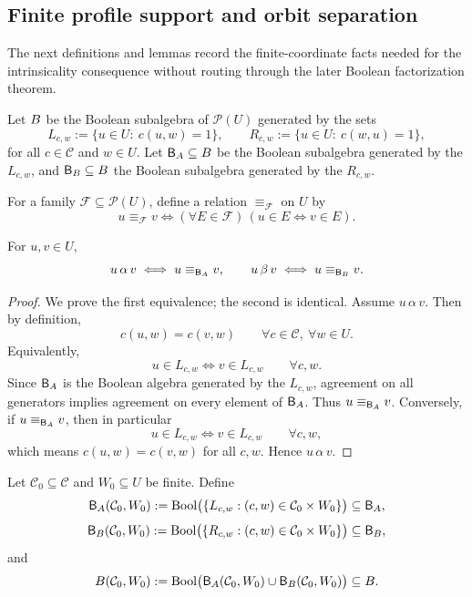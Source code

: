 \subsection{Finite profile support and orbit separation}
\label{subsec:finite-profile-support}
The next definitions and lemmas record the finite-coordinate facts needed
for the intrinsicality consequence without routing through the later
Boolean factorization theorem.
\begin{definition}
	Let \(B\) be the Boolean subalgebra of \(\mathcal P(U)\) generated by
	the sets
	\[
		L_{c,w}:=\{u\in U:\ c(u,w)=1\},
		\qquad
		R_{c,w}:=\{u\in U:\ c(w,u)=1\},
	\]
	for all \(c\in\mathcal C\) and \(w\in U\).
	Let \(\mathsf B_A\subseteq B\) be the Boolean subalgebra generated by the
	\(L_{c,w}\), and \(\mathsf B_B\subseteq B\) the Boolean subalgebra generated by
	the \(R_{c,w}\).
\end{definition}
\begin{definition}
	For a family \(\mathcal F\subseteq\mathcal P(U)\), define a relation
	\(\equiv_{\mathcal F}\) on \(U\) by
	\[
		u\equiv_{\mathcal F} v
		\iff
		(\forall E\in\mathcal F)\,
		(u\in E \Leftrightarrow v\in E).
	\]
\end{definition}
\begin{lemma}
	\label{lem:classes-boolean}
	For \(u,v\in U\),
	\[
		u\,\alpha\,v \iff u\equiv_{\mathsf B_A} v,
		\qquad
		u\,\beta\,v \iff u\equiv_{\mathsf B_B} v.
	\]
\end{lemma}
\begin{proof}
	We prove the first equivalence; the second is identical.
	Assume \(u\,\alpha\,v\). Then by definition,
	\[
		c(u,w)=c(v,w)
		\qquad
		\forall c\in\mathcal C,\ \forall w\in U.
	\]
	Equivalently,
	\[
		u\in L_{c,w}
		\iff
		v\in L_{c,w}
		\qquad
		\forall c,w.
	\]
	Since \(\mathsf B_A\) is the Boolean algebra generated by the \(L_{c,w}\),
	agreement on all generators implies agreement on every element of
	\(\mathsf B_A\). Thus \(u\equiv_{\mathsf B_A} v\).
	Conversely, if \(u\equiv_{\mathsf B_A} v\), then in particular
	\[
		u\in L_{c,w}
		\iff
		v\in L_{c,w}
		\qquad
		\forall c,w,
	\]
	which means \(c(u,w)=c(v,w)\) for all \(c,w\). Hence \(u\,\alpha\,v\).
\end{proof}
\begin{definition}
	Let \(\mathcal C_0\subseteq\mathcal C\) and \(W_0\subseteq U\) be finite.
	Define
	\[
		\mathsf B_A(\mathcal C_0,W_0)
		:=
		\operatorname{Bool}\bigl(\{L_{c,w}:(c,w)\in \mathcal C_0\times W_0\}\bigr)
		\subseteq \mathsf B_A,
	\]
	\[
		\mathsf B_B(\mathcal C_0,W_0)
		:=
		\operatorname{Bool}\bigl(\{R_{c,w}:(c,w)\in \mathcal C_0\times W_0\}\bigr)
		\subseteq \mathsf B_B,
	\]
	and
	\[
		B(\mathcal C_0,W_0)
		:=
		\operatorname{Bool}\bigl(\mathsf B_A(\mathcal C_0,W_0)\cup\mathsf B_B(\mathcal C_0,W_0)\bigr)
		\subseteq B.
	\]
\end{definition}
